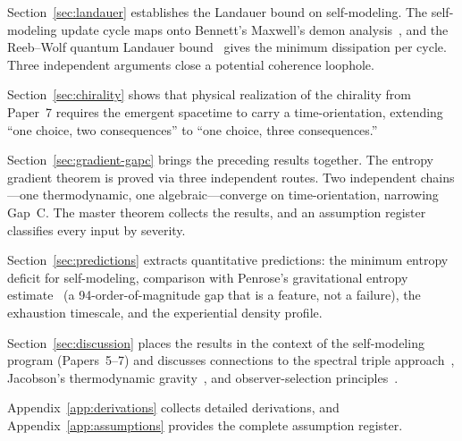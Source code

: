 Section~\ref{sec:landauer} establishes the Landauer bound on
self-modeling.  The self-modeling update cycle maps onto Bennett's
Maxwell's demon analysis~\cite{Bennett1982}, and the Reeb--Wolf quantum
Landauer bound~\cite{ReebWolf2014} gives the minimum dissipation per
cycle.  Three independent arguments close a potential coherence
loophole.

Section~\ref{sec:chirality} shows that physical realization of the
chirality from Paper~7 requires the emergent spacetime to carry a
time-orientation, extending ``one choice, two consequences'' to
``one choice, three consequences.''

Section~\ref{sec:gradient-gapc} brings the preceding results together.
The entropy gradient theorem is proved via three independent routes.
Two independent chains---one thermodynamic, one algebraic---converge
on time-orientation, narrowing Gap~C\@.  The master theorem collects
the results, and an assumption register classifies every input by
severity.

Section~\ref{sec:predictions} extracts quantitative predictions:
the minimum entropy deficit for self-modeling, comparison with
Penrose's gravitational entropy estimate~\cite{Penrose1979} (a
94-order-of-magnitude gap that is a feature, not a failure), the
exhaustion timescale, and the experiential density profile.

Section~\ref{sec:discussion} places the results in the context of
the self-modeling program (Papers~5--7) and discusses connections to
the spectral triple approach~\cite{CCM2007}, Jacobson's thermodynamic
gravity~\cite{Jacobson1995}, and observer-selection
principles~\cite{Hoffman2015}.

Appendix~\ref{app:derivations} collects detailed derivations, and
Appendix~\ref{app:assumptions} provides the complete assumption
register.
